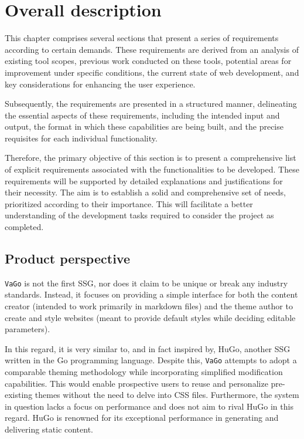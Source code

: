 
\section{Overall description}\label{overall-description}

This chapter comprises several sections that present a series of
requirements according to certain demands. These requirements are
derived from an analysis of existing tool scopes, previous work
conducted on these tools, potential areas for improvement under specific
conditions, the current state of web development, and key considerations
for enhancing the user experience.

Subsequently, the requirements are presented in a structured manner,
delineating the essential aspects of these requirements, including the
intended input and output, the format in which these capabilities are
being built, and the precise requisites for each individual
functionality.

Therefore, the primary objective of this section is to present a
comprehensive list of explicit requirements associated with the
functionalities to be developed. These requirements will be supported by
detailed explanations and justifications for their necessity. The aim is
to establish a solid and comprehensive set of needs, prioritized
according to their importance. This will facilitate a better
understanding of the development tasks required to consider the project
as completed.

\subsection{Product perspective}\label{subsubsec:product-perspective}

\texttt{VaGo} is not the first SSG, nor does it claim to be unique or
break any industry standards. Instead, it focuses on providing a simple
interface for both the content creator (intended to work primarily in
markdown files) and the theme author to create and style websites (meant
to provide default styles while deciding editable parameters).

In this regard, it is very similar to, and in fact inspired by,
HuGo\cite{hugo}\cite{wikihugo}, another SSG written in the Go programming language.
Despite this, \texttt{VaGo} attempts to adopt a comparable theming
methodology while incorporating simplified modification capabilities.
This would enable prospective users to reuse and personalize
pre-existing themes without the need to delve into CSS files.
Furthermore, the system in question lacks a focus on performance and
does not aim to rival HuGo in this regard. HuGo is renowned for its
exceptional performance in generating and delivering static content.

